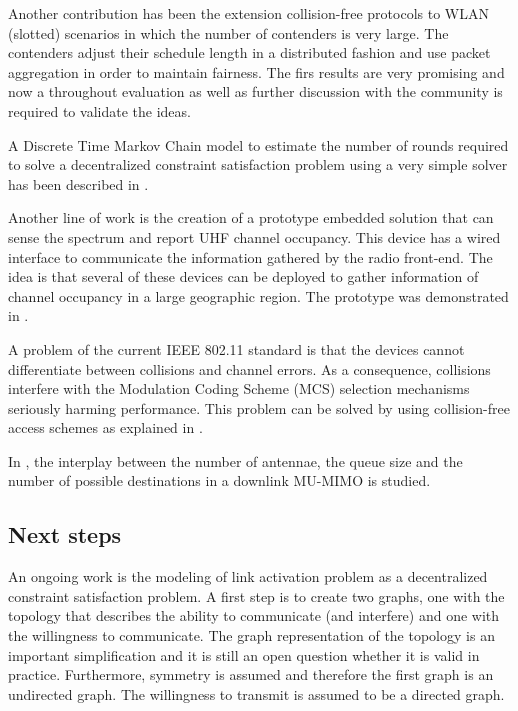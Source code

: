 \documentclass[a4paper,twocolumns]{article}%
\begin{document}
Another contribution has been the extension collision-free protocols to WLAN (slotted) scenarios in which the number of contenders is very large.
The contenders adjust their schedule length in a distributed fashion and use packet aggregation in order to maintain fairness.
The firs results are very promising \cite{sanabria2013fec} and now a throughout evaluation as well as further discussion with the community is required to validate the ideas.

A Discrete Time Markov Chain model to estimate the number of rounds required to solve a decentralized constraint satisfaction problem using a very simple solver has been described in \cite{barcelo2012mdc}.

Another line of work is the creation of a prototype embedded solution that can sense the spectrum and report UHF channel occupancy.
This device has a wired interface to communicate the information gathered by the radio front-end.
The idea is that several of these devices can be deployed to gather information of channel occupancy in a large geographic region.
The prototype was demonstrated in \cite{sanabria2012ssu}.

A problem of the current IEEE 802.11 standard is that the devices cannot differentiate between collisions and channel errors.
As a consequence, collisions interfere with the Modulation Coding Scheme (MCS) selection mechanisms seriously harming performance.
This problem can be solved by using collision-free access schemes as explained in \cite{martorell2012pec}.

In \cite{bellalta2012ppa, bellalta2012rqp}, the interplay between the number of antennae, the queue size and the number of possible destinations in a downlink MU-MIMO is studied.


\subsection{Next steps}


An ongoing work is the modeling of link activation problem as a decentralized constraint satisfaction problem.
A first step is to create two graphs, one with the topology that describes the ability to communicate (and interfere) and one with the willingness to communicate.
The graph representation of the topology is an important simplification and it is still an open question whether it is valid in practice.
Furthermore, symmetry is assumed and therefore the first graph is an undirected graph.
The willingness to transmit is assumed to be a directed graph.
\end{document}
